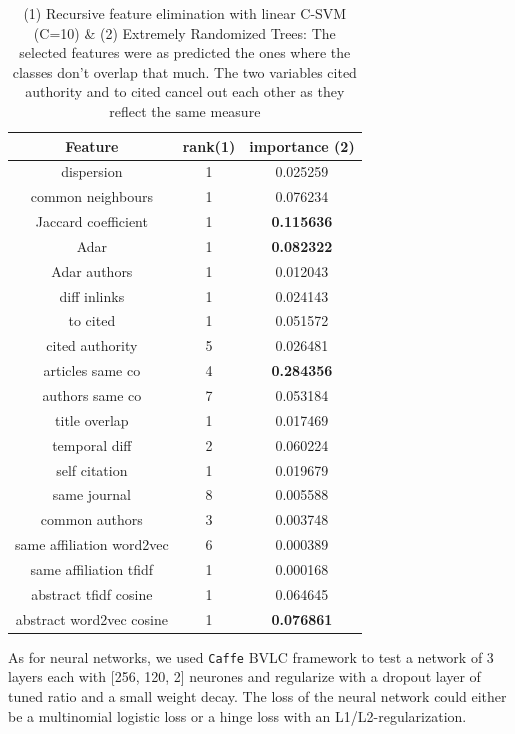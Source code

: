 \documentclass{acmsiggraph}
\begin{document}
\begin{table}[H]
\centering
\begin{tabular}{|c|c|c|}
\hline
Feature    &                rank(1)    &  importance (2)\\
\hline
\hline
dispersion               &    1    & 0.025259  \\
common neighbours        &    1    &  0.076234  \\
Jaccard coefficient      &    1	   &  \textbf{0.115636}  \\
Adar                     &    1   &  \textbf{0.082322}  \\
Adar authors             &    1   & 0.012043    \\
diff inlinks             &    1   &   0.024143  \\
to cited                 &    1   & 0.051572 \\
cited authority          &    5   &   0.026481   \\
articles same co         &    4   &    \textbf{0.284356} \\
authors same co          &    7   &  0.053184   \\
title overlap            &    1   &   0.017469  \\
temporal diff            &    2   & 0.060224    \\
self citation            &    1   &   0.019679  \\
same journal             &    8   & 0.005588    \\
common authors           &    3   &   0.003748   \\
same affiliation word2vec&    6   &   0.000389   \\
same affiliation tfidf   &    1   &   0.000168  \\
abstract tfidf cosine    &    1   &   0.064645  \\
abstract word2vec cosine &    1   &   \textbf{0.076861}  \\
\hline
\end{tabular}
\caption{(1) Recursive feature elimination with linear C-SVM (C=10) \& (2) Extremely Randomized Trees: The selected features were as predicted the ones where the classes don't overlap that much. The two variables cited authority and to cited cancel out each other as they reflect the same measure}
\end{table}
As for neural networks, we used \texttt{Caffe} BVLC framework to test a network of 3 layers each with [256, 120, 2] neurones and regularize with a dropout layer of tuned ratio and a small weight decay. The loss of the neural network could either be a multinomial logistic loss or a hinge loss with an L1/L2-regularization.\\
\end{document}
